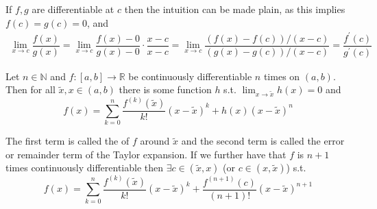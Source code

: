 \documentclass{article}
\begin{document}
If $f, g$ are differentiable at $c$ then the intuition can be made plain, as this implies $f(c) = g(c) = 0$, and
\begin{align*}
    \lim_{x \to c} \dfrac{f(x)}{g(x)}
    =
    \lim_{x \to c} \dfrac{f(x) - 0}{g(x) - 0} \cdot \dfrac{x - c}{x - c}
    =
    \lim_{x \to c} \dfrac{(f(x) - f(c)) / (x - c)}{(g(x) - g(c)) / (x - c)}
    =
    \dfrac{f^{\prime}(c)}{g^{\prime}(c)}
\end{align*}

\begin{theorem}
  Let $n \in \mathbb{N}$ and $f: [a, b] \to \mathbb{R}$ be continuously differentiable $n$ times on $(a, b)$. Then for all $\widetilde{x}, x \in (a, b)$ there is some function $h$ s.t. $\lim_{x \to \widetilde{x}} h(x) = 0$ and
  \[
    f(x)
    = \sum^{n}_{k = 0} \dfrac{f^{(k)}(\widetilde{x})}{k!} (x - \widetilde{x})^k
    + h(x) (x - \widetilde{x})^n
  \]

  The first term is called the  of $f$ around $\widetilde{x}$ and the second term is called the error or remainder term of the Taylor expansion. If we further have that $f$ is $n + 1$ times continuously differentiable then $\exists c \in (\widetilde{x}, x)$ (or $c \in (x, \widetilde{x})$) s.t.
  \[
    f(x)
    = \sum^{n}_{k = 0} \dfrac{f^{(k)}(\widetilde{x})}{k!} (x - \widetilde{x})^k
    + \dfrac{f^{(n + 1)}(c)}{(n + 1)!} (x - \widetilde{x})^{n + 1}
  \]
\end{theorem}
\end{document}

